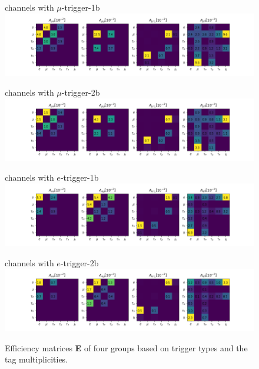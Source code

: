 

\begin{figure}[ht]
    \centering
    channels with $\mu$-trigger-1b \\
    \includegraphics[width=\textwidth]{chapters/Analysis/sectionStatisticalAnalysis/figures/acc_mu1b.png}
    
    channels with $\mu$-trigger-2b \\
    \includegraphics[width=\textwidth]{chapters/Analysis/sectionStatisticalAnalysis/figures/acc_mu2b.png}
    
    channels with $e$-trigger-1b \\
    \includegraphics[width=\textwidth]{chapters/Analysis/sectionStatisticalAnalysis/figures/acc_e1b.png}
    
    channels with $e$-trigger-2b \\
    \includegraphics[width=\textwidth]{chapters/Analysis/sectionStatisticalAnalysis/figures/acc_e2b.png}
    
    \caption{ Efficiency matrices \textbf{E} of four groups based on trigger types and the \PQb tag multiplicities. }
    \label{fig:efficencyMatrix}
\end{figure}





